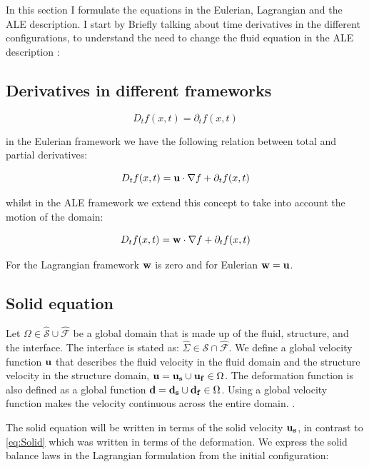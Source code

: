In this section I formulate the equations in the Eulerian, Lagrangian and the ALE description. I start by Briefly talking about time derivatives in the different configurations, to understand the need to change the fluid equation in the ALE description \cite{Wick2011}:

\subsection{Derivatives in different frameworks}
\begin{equation}
D_t f(x,t) = \partial_t f(x,t) 
\end{equation}

in the Eulerian framework we have the following relation between total and partial derivatives:

\begin{equation}
D_t f(x,t) = \bold{u}\cdot \nabla{f} + \partial_t f(x,t)
\end{equation}

whilst in the ALE framework we extend this concept to take into account the motion of the domain:

\begin{equation}
D_t f(x,t) = \bold{w} \cdot\nabla{f} + \partial_t f(x,t)
\end{equation}

For the Lagrangian framework $ \bold{w}$ is zero and for Eulerian $\bold{w} = \bold{u}$.

\subsection{Solid equation}
Let $\Omega \in \hat{\mathcal{S}} \cup \hat{\mathcal{F}} $ be a global domain that is made up of the fluid, structure, and the interface. The interface is stated as: $ \hat{\Sigma} \in \hat{\mathcal{S}} \cap \hat{\mathcal{F}}  $. We define a global velocity function $\bold{u}$ that describes the fluid velocity in the fluid domain and the structure velocity in the structure domain, $\bold{u} = \bold{u_s} \cup \bold{u_f} \in \Omega$. The deformation function is also defined as a global function $\bold{d} = \bold{d_s} \cup \bold{d_f} \in \Omega$. Using a global velocity function makes the velocity continuous across the entire domain. .\newline 

The solid equation will be written in terms of the solid velocity $\bold{u_s}$, in contrast to \ref{eq:Solid} which was written in terms of the deformation.
We express the solid balance laws in the Lagrangian formulation from the initial configuration:

